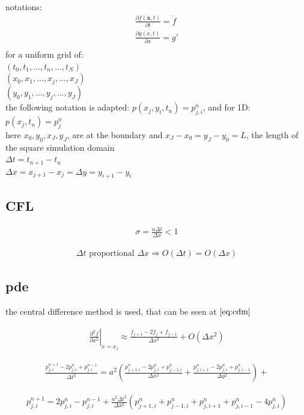 \documentclass{article}
\newcommand{\pd}[2]{\frac{\partial #1}{\partial #2}}
\numberwithin{equation}{section}
\begin{document}
notations:
\begin{align}
	\pd{f(\bm x, t)}{t} = \dot f\\
	\pd{g(x,t)}{x} = g'\\
\end{align}
for a uniform grid of:\\
$(t_0,t_1,...,t_n,...,t_N)$\\
$(x_0,x_1,...,x_j,...,x_J)$\\
$(y_0,y_1,...,y_j,...,y_J)$\\
the following notation is adapted: $p(x_j,y_i,t_n) = p^n_{j,i}$, and for 1D: $p(x_j,t_n) = p^n_{j}$\\
here $x_0,y_0,x_J,y_J$, are at the boundary and $x_J-x_0=y_J-y_0=L$, the length of the square simulation domain\\
$\Delta t = t_{n+1} - t_n$\\
$\Delta x = x_{j+1} - x_j = \Delta y = y_{i+1} - y_i$

\subsection{CFL}
\begin{align}
	\sigma = \frac{a \Delta t}{\Delta x} < 1 
\end{align}

\begin{align}
	\Delta t \text{ proportional }  \Delta x \Rightarrow O(\Delta t) = O(\Delta x)
\end{align}

\subsection{pde}

the central difference method is used, that can be seen at $\ref{eq:cdm}$

\begin{align}\label{eq:cdm}
	\left. \pd{^2f}{x^2}\right|_{x=x_j} \approx \frac{f_{j+1} - 2 f_{j} + f_{j-1}}{\Delta x^2} + O(\Delta x^2)
\end{align}

\begin{align}\label{eq:disc}
	\frac{p^{n+1}_{j,i} - 2 p^{n}_{j,i} + p^{n-1}_{j,i}}{\Delta t^2} = a^2\left( \frac{p^{n}_{j+1,i} - 2 p^{n}_{j,i} + p^{n}_{j-1,i}}{\Delta x^2} + \frac{p^{n}_{j,i+1} - 2 p^{n}_{j,i} + p^{n}_{j,i-1}}{\Delta y^2}\right) + 
\end{align}

\begin{align}\label{eq:disc}
	p^{n+1}_{j,i} = 2 p^{n}_{j,i} - p^{n-1}_{j,i} + \frac{a^2\Delta t^2}{\Delta x^2}\left( p^{n}_{j+1,i} + p^{n}_{j-1,i} + p^{n}_{j,i+1} + p^{n}_{j,i-1} - 4 p^{n}_{j,i}\right)
\end{align}
\end{document}
